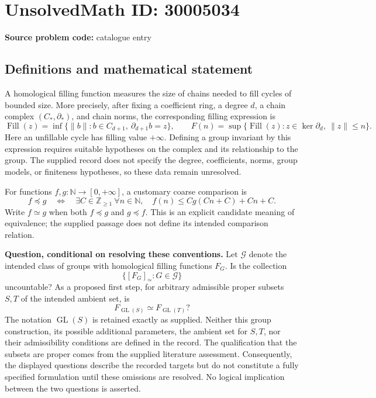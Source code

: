 \documentclass[11pt]{article}
\begin{document}
\section*{UnsolvedMath ID: 30005034}
\textbf{Source problem code:} catalogue entry
\subsection{Definitions and mathematical statement}
A homological filling function measures the size of chains needed to fill cycles of bounded size. More precisely, after fixing a coefficient ring, a degree \(d\), a chain complex \((C_*,\partial_*)\), and chain norms, the corresponding filling expression is
\[
\operatorname{Fill}(z)=\inf\{\|b\|:b\in C_{d+1},\ \partial_{d+1}b=z\},\qquad
F(n)=\sup\{\operatorname{Fill}(z):z\in\ker\partial_d,\ \|z\|\le n\}.
\]
Here an unfillable cycle has filling value \(+\infty\). Defining a group invariant by this expression requires suitable hypotheses on the complex and its relationship to the group. The supplied record does not specify the degree, coefficients, norms, group models, or finiteness hypotheses, so these data remain unresolved.

For functions \(f,g:\mathbb N\to[0,+\infty]\), a customary coarse comparison is
\[
f\preceq g\quad\Longleftrightarrow\quad
\exists C\in\mathbb Z_{\ge1}\ \forall n\in\mathbb N,\quad
f(n)\le Cg(Cn+C)+Cn+C.
\]
Write \(f\simeq g\) when both \(f\preceq g\) and \(g\preceq f\). This is an explicit candidate meaning of equivalence; the supplied passage does not define its intended comparison relation.

\textbf{Question, conditional on resolving these conventions.} Let \(\mathcal G\) denote the intended class of groups with homological filling functions \(F_G\). Is the collection
\[
\{[F_G]_{\simeq}:G\in\mathcal G\}
\]
uncountable? As a proposed first step, for arbitrary admissible proper subsets \(S,T\) of the intended ambient set, is
\[
F_{\operatorname{GL}(S)}\simeq F_{\operatorname{GL}(T)}?
\]
The notation \(\operatorname{GL}(S)\) is retained exactly as supplied. Neither this group construction, its possible additional parameters, the ambient set for \(S,T\), nor their admissibility conditions are defined in the record. The qualification that the subsets are proper comes from the supplied literature assessment. Consequently, the displayed questions describe the recorded targets but do not constitute a fully specified formulation until these omissions are resolved. No logical implication between the two questions is asserted.
\end{document}
